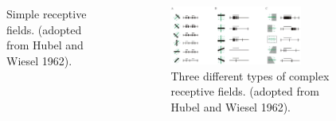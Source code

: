 \documentclass[a4paper,9pt]{beamer}
\theoremstyle{mytheoremstyle}
\begin{document}
\begin{frame}
\begin{columns}
\begin{figure}
\begin{center}
\end{center}
	\caption{Simple receptive fields. (adopted from Hubel and Wiesel 1962).}
\end{figure}
\vspace{0.2cm}
\begin{figure}
\begin{center}
  \includegraphics[width=0.75\textwidth]{res/complex_cells.png}
\end{center}
	\caption{Three different types of complex receptive fields. (adopted from Hubel and Wiesel 1962).}
\end{figure}
\end{columns}
\end{frame}
\end{document}
